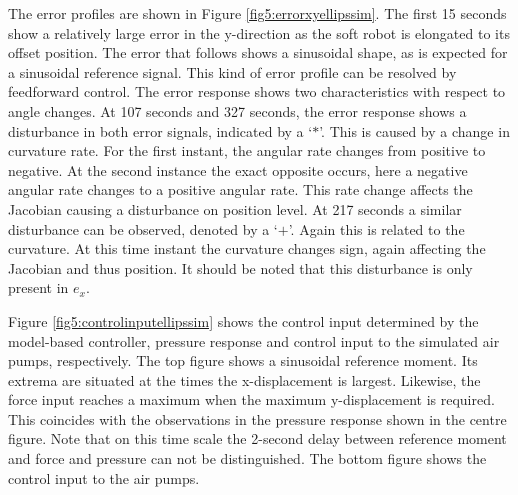 The error profiles are shown in Figure \ref{fig5:errorxyellipssim}. The first 15 seconds show a relatively large error in the y-direction as the soft robot is elongated to its offset position. The error that follows shows a sinusoidal shape, as is expected for a sinusoidal reference signal. This kind of error profile can be resolved by feedforward control. The error response shows two characteristics with respect to angle changes. At 107 seconds and 327 seconds, the error response shows a disturbance in both error signals, indicated by a `$*$'. This is caused by a change in curvature rate. For the first instant, the angular rate changes from positive to negative. At the second instance the exact opposite occurs, here a negative angular rate changes to a positive angular rate. This rate change affects the Jacobian causing a disturbance on position level. At 217 seconds a similar disturbance can be observed, denoted by a `$+$'. Again this is related to the curvature. At this time instant the curvature changes sign, again affecting the Jacobian and thus position. It should be noted that this disturbance is only present in $e_x$.




Figure \ref{fig5:controlinputellipssim} shows the control input determined by the model-based controller, pressure response and control input to the simulated air pumps, respectively. The top figure shows a sinusoidal reference moment. Its extrema are situated at the times the x-displacement is largest. Likewise, the force input reaches a maximum when the maximum y-displacement is required. This coincides with the observations in the pressure response shown in the centre figure. Note that on this time scale the 2-second delay between reference moment and force and pressure can not be distinguished. The bottom figure shows the control input to the air pumps.



